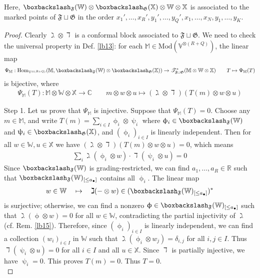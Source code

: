 \documentclass[11pt,b5paper,notitlepage]{article}
\theoremstyle{definition}
\theoremstyle{plain}
\newcommand{\fk}{\mathfrak}
\newcommand{\Hom}{\mathrm{Hom}}
\newcommand{\blt}{\bullet}
\newcommand{\Vbb}{\mathbb V}
\newcommand{\Xbb}{\mathbb X}
\newcommand{\Wbb}{\mathbb W}
\newcommand{\Mbb}{\mathbb M}
\newcommand{\Cbb}{\mathbb C}
\newcommand{\Rbb}{\mathbb R}
\newcommand{\<}{\left\langle}
\renewcommand{\>}{\right\rangle}
\newcommand{\ST}{\mathscr{T}}
\newcommand{\bbs}{\boxbackslash}
\newcommand{\Mod}{\mathrm{Mod}}
\newcommand{\ff}{\mathfrak{F}}
\newcommand{\fg}{\mathfrak{G}}
\numberwithin{equation}{section}
\begin{document}
Here, $\bbs_{\fk F}(\Wbb)\otimes \bbs_{\fk G}(\Xbb)\otimes\Wbb\otimes \Xbb$ is associated to the marked points of $\ff\sqcup\fg$ in the order $x_1',\dots,x_R',y_1',\dots,y_Q',x_1,\dots,x_N,y_1,\dots,y_K$.



\begin{proof}
Clearly $\gimel\otimes\daleth$ is a conformal block associated to $\ff\sqcup\fg$. We need to check the universal property in Def. \ref{lb13}: for each $\Mbb\in\Mod(\Vbb^{\otimes(R+Q)})$, the linear map
\begin{align*}
\Psi_\Mbb:\Hom_{\Vbb^{\otimes (R+Q)}}(\Mbb,\bbs_{\fk F}(\Wbb)\otimes \bbs_{\fk G}(\Xbb))\rightarrow\ST^*_{\ff\sqcup\fg}(\Mbb\otimes \Wbb\otimes\Xbb)\qquad T\mapsto \Psi_\Mbb(T)
\end{align*}
is bijective, where
\begin{align*}
\Psi_\Mbb(T):\Mbb\otimes\Wbb\otimes\Xbb\rightarrow\Cbb\qquad m\otimes w\otimes u\mapsto (\gimel\otimes\daleth)(T(m)\otimes w\otimes u)
\end{align*}

Step 1. Let us prove that $\Psi_\Mbb$ is injective. Suppose that $\Psi_\Mbb(T)=0$. Choose any $m\in\Mbb$, and write $T(m)=\sum_{i\in I} \upphi_i\otimes\uppsi_i$ where $\upphi_i\in\bbs_\ff(\Wbb)$ and $\uppsi_i\in\bbs_\fg(\Xbb)$, and $(\upphi_i)_{i\in I}$ is linearly independent. Then for all $w\in\Wbb,u\in\Xbb$ we have $(\gimel\otimes\daleth)(T(m)\otimes w\otimes u)=0$, which means
\begin{align*}
\sum_i \gimel (\upphi_i\otimes w)\cdot \daleth(\uppsi_i\otimes u)=0
\end{align*}
Since $\bbs_\ff(\Wbb)$ is grading-restricted, we can find $a_1,\dots,a_R\in\Rbb$ such that $\bbs_\ff(\Wbb)_{[\leq a_\blt]}$ contains all $\upphi_i$.  The linear map
\begin{align*}
w\in\Wbb\quad\mapsto \quad \gimel(-\otimes w)\in(\bbs_\ff(\Wbb)_{[\leq a_\blt]})^*
\end{align*}
is surjective; otherwise, we can find a nonzero $\upphi\in \bbs_\ff(\Wbb)_{[\leq a_\blt]}$ such that $\gimel(\upphi\otimes w)=0$ for all $w\in\Wbb$, contradicting the partial injectivity of $\gimel$ (cf. Rem. \ref{lb15}). Therefore, since $(\upphi_i)_{i\in I}$ is linearly independent, we can find a collection $(w_i)_{i\in I}$ in $\Wbb$ such that $\gimel(\upphi_i\otimes w_j)=\delta_{i,j}$ for all $i,j\in I$. Thus $\daleth(\uppsi_i\otimes u)=0$ for all $i\in I$ and all $u\in \Xbb$. Since $\daleth$ is partially injective, we have $\uppsi_i=0$. This proves $T(m)=0$. Thus $T=0$.\\[-1ex]



\end{proof}
\end{document}
